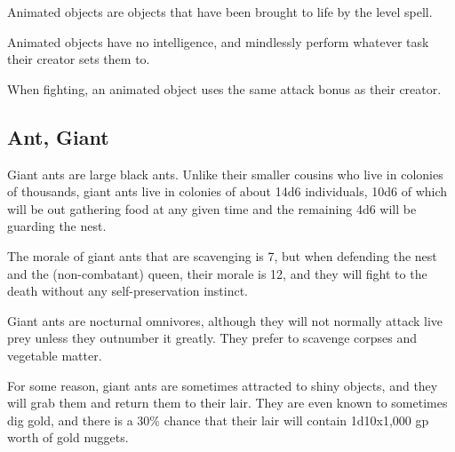 \begin{multicols*}{2}
Animated objects are objects that have been brought to life by the  level  spell.

Animated objects have no intelligence, and mindlessly perform whatever task their creator sets them to.

When fighting, an animated object uses the same attack bonus as their creator.

\subsection{Ant, Giant}


Giant ants are large black ants. Unlike their smaller cousins who live in colonies of thousands, giant ants live in colonies of about 14d6 individuals, 10d6 of which will be out gathering food at any given time and the remaining 4d6 will be guarding the nest.

The morale of giant ants that are scavenging is 7, but when defending the nest and the (non-combatant) queen, their morale is 12, and they will fight to the death without any self-preservation instinct.

Giant ants are nocturnal omnivores, although they will not normally attack live prey unless they outnumber it greatly. They prefer to scavenge corpses and vegetable matter.

For some reason, giant ants are sometimes attracted to shiny objects, and they will grab them and return them to their lair. They are even known to sometimes dig gold, and there is a 30\% chance that their lair will contain 1d10x1,000 gp worth of gold nuggets.


\end{multicols*}
